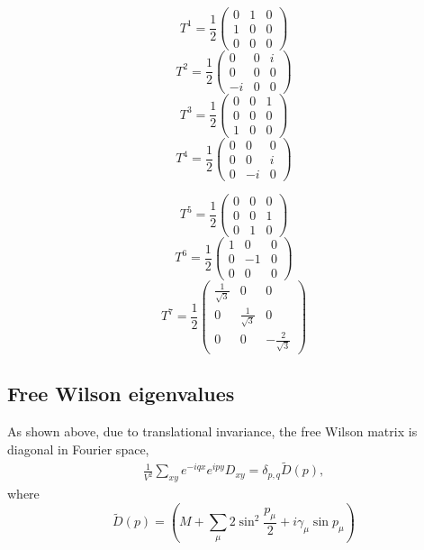 \documentclass[letter,10pt]{report}
\begin{document}
$$
T^1 =
\frac{1}{2} \left(
\begin{array}{ccc}
0  & 1 & 0 \\
1  & 0 & 0\\
0  & 0 & 0
  \end{array}\right)
$$
$$
T^2 =
\frac{1}{2} \left(
\begin{array}{ccc}
0  & 0 & i \\
0  & 0 & 0\\
-i  & 0 & 0
  \end{array}\right)
$$
$$
T^3 =
\frac{1}{2} \left(
\begin{array}{ccc}
0  & 0 & 1 \\
0  & 0 & 0\\
1  & 0 & 0
  \end{array}\right)
$$
$$
T^4 =
\frac{1}{2} \left(
\begin{array}{ccc}
0  & 0 & 0 \\
0  & 0 & i\\
0  & -i & 0
  \end{array}\right)
$$

$$
T^5 =
\frac{1}{2} \left(
\begin{array}{ccc}
0  & 0 & 0 \\
0  & 0 & 1\\
0  & 1 & 0
  \end{array}\right)
$$
$$
T^6 =
\frac{1}{2} \left(
\begin{array}{ccc}
1  & 0 & 0 \\
0  & -1 & 0\\
0  & 0 & 0
  \end{array}\right)
$$
$$
T^7 =
\frac{1}{2} \left(
\begin{array}{ccc}
\frac{1}{\sqrt{3}}  & 0 & 0 \\
0  & \frac{1}{\sqrt{3}} & 0\\
0  & 0 & -\frac{2}{\sqrt{3}}
  \end{array}\right)
$$

\subsection{Free Wilson eigenvalues}

As shown above, due to translational invariance, the free Wilson matrix is diagonal in Fourier space,
\begin{eqnarray}
 \frac{1}{V^2} \sum_{xy}  e^{-iqx} e^{ipy} D_{xy}
= \delta_{p,q} \tilde{D}(p),
\end{eqnarray}
where
$$
\tilde{D}(p) = \left( M + \sum_\mu 2 \sin^2 \frac{p_\mu}{2} + i \gamma_\mu \sin p_\mu \right)
$$
\end{document}
